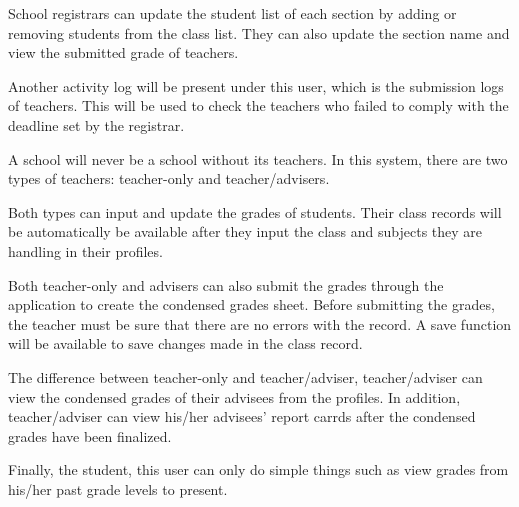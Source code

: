 \documentclass[11pt,a4paper,titlepage]{article}
\begin{document}
School registrars can update the student list of each section by adding or removing students from the class list. They can also update the section name and view the submitted grade of teachers.

Another activity log will be present under this user, which is the submission logs of teachers. This will be used to check the teachers who failed to comply with the deadline set by the registrar.

A school will never be a school without its teachers. In this system, there are two types of teachers: teacher-only and teacher/advisers.

Both types can input and update the grades of students. Their class records will be automatically be available after they input the class and subjects they are handling in their profiles.

Both teacher-only and advisers can also submit the grades through the application to create the condensed grades sheet. Before submitting the grades, the teacher must be sure that there are no errors with the record. A save function will be available to save changes made in the class record.

The difference between teacher-only and teacher/adviser, teacher/adviser can view the condensed grades of their advisees from the profiles. In addition, teacher/adviser can view his/her advisees' report carrds after the condensed grades have been finalized.

Finally, the student, this user can only do simple things such as view grades from his/her past grade levels to present.
\end{document}
